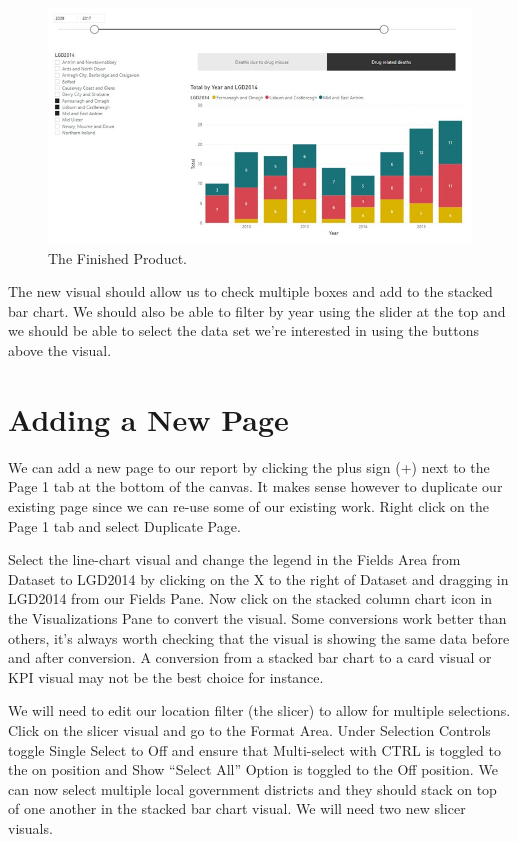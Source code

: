\documentclass[
]{book}
\begin{document}
\begin{figure}
\centering
\includegraphics{bi10.jpg}
\caption{The Finished Product.}
\end{figure}

The new visual should allow us to check multiple boxes and add to the stacked bar chart. We should also be able to filter by year using the slider at the top and we should be able to select the data set we're interested in using the buttons above the visual.

\hypertarget{adding-a-new-page}{%
\section{Adding a New Page}\label{adding-a-new-page}}

We can add a new page to our report by clicking the plus sign (+) next to the Page 1 tab at the bottom of the canvas. It makes sense however to duplicate our existing page since we can re-use some of our existing work. Right click on the Page 1 tab and select Duplicate Page.

Select the line-chart visual and change the legend in the Fields Area from Dataset to LGD2014 by clicking on the X to the right of Dataset and dragging in LGD2014 from our Fields Pane. Now click on the stacked column chart icon in the Visualizations Pane to convert the visual. Some conversions work better than others, it's always worth checking that the visual is showing the same data before and after conversion. A conversion from a stacked bar chart to a card visual or KPI visual may not be the best choice for instance.

We will need to edit our location filter (the slicer) to allow for multiple selections. Click on the slicer visual and go to the Format Area. Under Selection Controls toggle Single Select to Off and ensure that Multi-select with CTRL is toggled to the on position and Show ``Select All'' Option is toggled to the Off position. We can now select multiple local government districts and they should stack on top of one another in the stacked bar chart visual. We will need two new slicer visuals.
\end{document}
